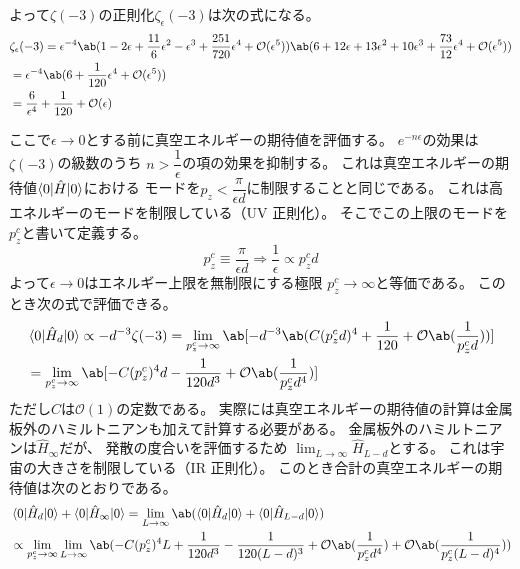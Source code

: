 よって$\zeta(-3)$の正則化$\zeta_\epsilon(-3)$は次の式になる。
\begin{equation}
  \begin{split}
    &\zeta_\epsilon(-3)
    =\epsilon^{-4}
    \ab(1-2\epsilon+\frac{11}{6}\epsilon^2-\epsilon^3
    +\frac{251}{720}\epsilon^4+\mathcal{O}(\epsilon^5))
    \ab(
    6+12\epsilon+13\epsilon^2+10\epsilon^3+\frac{73}{12}\epsilon^4
    +\mathcal{O}(\epsilon^5)
    ) \\
    &=\epsilon^{-4}\ab(6+\frac{1}{120}\epsilon^4+\mathcal{O}(\epsilon^5)) \\
    &=\frac{6}{\epsilon^4}+\frac{1}{120}+\mathcal{O}(\epsilon)
  \end{split}
\end{equation}

ここで$\epsilon\rightarrow0$とする前に真空エネルギーの期待値を評価する。
$e^{-n\epsilon}$の効果は$\zeta(-3)$の級数のうち
$n>\dfrac{1}{\epsilon}$の項の効果を抑制する。
これは真空エネルギーの期待値$\braket{0|\hat{H}|0}$における
モードを$p_z<\dfrac{\pi}{\epsilon d}$に制限することと同じである。
これは高エネルギーのモードを制限している（UV 正則化）。
そこでこの上限のモードを$p_z^c$と書いて定義する。
\begin{equation}
  p_z^c\equiv\frac{\pi}{\epsilon d}
  \Rightarrow
  \frac{1}{\epsilon}\propto p_z^c d
\end{equation}
よって$\epsilon\rightarrow0$はエネルギー上限を無制限にする極限
$p_z^c\rightarrow\infty$と等価である。
このとき次の式で評価できる。
\begin{equation}
  \begin{split}
    &\braket{0|\hat{H}_d|0}
    \propto
    -d^{-3}\zeta(-3)
    =\lim_{p_z^c\rightarrow\infty}
    \ab[-d^{-3}\ab(
    C(p_z^cd)^4
    +\frac{1}{120}
    +\mathcal{O}\ab(\frac{1}{p_z^c d})
    )] \\
    &=\lim_{p_z^c\rightarrow\infty}\ab[
      -C(p_z^c)^4d-\frac{1}{120d^3}+\mathcal{O}\ab(\frac{1}{p_z^cd^4})]
  \end{split}
\end{equation}
ただし$C$は$\mathcal{O}(1)$の定数である。
実際には真空エネルギーの期待値の計算は金属板外のハミルトニアンも加えて計算する必要がある。
金属板外のハミルトニアンは$\hat{H}_\infty$だが、
発散の度合いを評価するため
$\lim_{L\rightarrow\infty}\hat{H}_{L-d}$とする。
これは宇宙の大きさを制限している（IR 正則化）。
このとき合計の真空エネルギーの期待値は次のとおりである。
\begin{equation}
  \begin{split}
    &\braket{0|\hat{H}_d|0}+\braket{0|\hat{H}_\infty|0}
    =\lim_{L\rightarrow\infty}\ab(\braket{0|\hat{H}_d|0}+\braket{0|\hat{H}_{L-d}|0}) \\
    &\propto\lim_{p_z^c\rightarrow\infty}\lim_{L\rightarrow\infty}
    \ab(-C(p_z^c)^4L
    +\frac{1}{120d^3}-\frac{1}{120(L-d)^3}
    +\mathcal{O}\ab(\frac{1}{p_z^cd^4})+\mathcal{O}\ab(\frac{1}{p_z^c(L-d)^4}))
  \end{split}
\end{equation}

